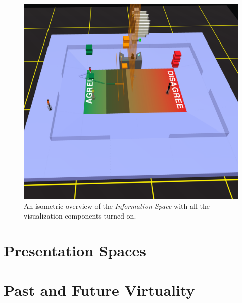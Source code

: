 \begin{figure}[t]
	\includegraphics{figures/information-space-iso-overview.png}
	\caption{An isometric overview of the \emph{Information Space} with all the visualization components turned on.}
	\label{fig:meeting_space_overview}
\end{figure}



\section{Presentation Spaces}


\section{Past and Future Virtuality}